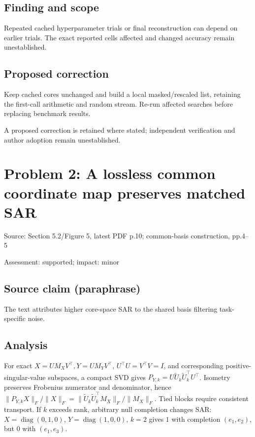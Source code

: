 \documentclass[11pt]{article}
\begin{document}
\subsection*{Finding and scope}

Repeated cached hyperparameter trials or final reconstruction can depend on earlier trials. The exact reported cells affected and changed accuracy remain unestablished.

\subsection*{Proposed correction}

Keep cached cores unchanged and build a local masked/rescaled list, retaining the first-call arithmetic and random stream. Re-run affected searches before replacing benchmark results.

A proposed correction is retained where stated; independent verification and author adoption remain unestablished.

\section*{Problem 2: A lossless common coordinate map preserves matched SAR}

Source: Section 5.2/Figure 5, latest PDF p.10; common-basis construction, pp.4–5

Assessment: supported; impact: minor

\subsection*{Source claim (paraphrase)}

The text attributes higher core-space SAR to the shared basis filtering task-specific noise.

\subsection*{Analysis}

For exact \(X=UM_XV^\top,Y=UM_YV^\top\), \(U^\top U=V^\top V=I\), and corresponding positive-singular-value subspaces, a compact SVD gives \(P_{Y,k}=U\widetilde U_k\widetilde U_k^\top U^\top\). Isometry preserves Frobenius numerator and denominator, hence \(\|P_{Y,k}X\|_F/\|X\|_F=\|\widetilde U_k\widetilde U_k^\top M_X\|_F/\|M_X\|_F\). Tied blocks require consistent transport. If \(k\) exceeds rank, arbitrary null completion changes SAR: \(X=\operatorname{diag}(0,1,0)\), \(Y=\operatorname{diag}(1,0,0)\), \(k=2\) gives \(1\) with completion \((e_1,e_2)\), but \(0\) with \((e_1,e_3)\).
\end{document}
